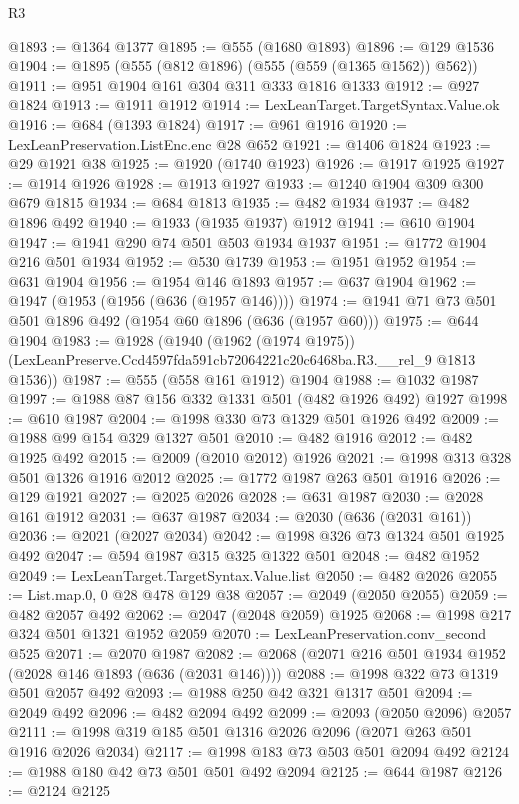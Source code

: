 \begin{lexlean}{R3}
\begin{coremodule}
@1893 := @1364 @1377
@1895 := @555 (@1680 @1893)
@1896 := @129 @1536
@1904 := @1895 (@555 (@812 @1896) (@555 (@559 (@1365 @1562)) @562))
@1911 := @951 @1904 @161 @304 @311 @333 @1816 @1333
@1912 := @927 @1824
@1913 := @1911 @1912
@1914 := LexLeanTarget.TargetSyntax.Value.ok
@1916 := @684 (@1393 @1824)
@1917 := @961 @1916
@1920 := LexLeanPreservation.ListEnc.enc @28 @652
@1921 := @1406 @1824
@1923 := @29 @1921 @38
@1925 := @1920 (@1740 @1923)
@1926 := @1917 @1925
@1927 := @1914 @1926
@1928 := @1913 @1927
@1933 := @1240 @1904 @309 @300 @679 @1815
@1934 := @684 @1813
@1935 := @482 @1934
@1937 := @482 @1896 @492
@1940 := @1933 (@1935 @1937) @1912
@1941 := @610 @1904
@1947 := @1941 @290 @74 @501 @503 @1934 @1937
@1951 := @1772 @1904 @216 @501 @1934
@1952 := @530 @1739
@1953 := @1951 @1952
@1954 := @631 @1904
@1956 := @1954 @146 @1893
@1957 := @637 @1904
@1962 := @1947 (@1953 (@1956 (@636 (@1957 @146))))
@1974 := @1941 @71 @73 @501 @501 @1896 @492 (@1954 @60 @1896 (@636 (@1957 @60)))
@1975 := @644 @1904
@1983 := @1928
    (@1940
      (@1962 (@1974 @1975))
      (LexLeanPreserve.Ccd4597fda591cb72064221c20c6468ba.R3.__rel_9 @1813 @1536))
@1987 := @555 (@558 @161 @1912) @1904
@1988 := @1032 @1987
@1997 := @1988 @87 @156 @332 @1331 @501 (@482 @1926 @492) @1927
@1998 := @610 @1987
@2004 := @1998 @330 @73 @1329 @501 @1926 @492
@2009 := @1988 @99 @154 @329 @1327 @501
@2010 := @482 @1916
@2012 := @482 @1925 @492
@2015 := @2009 (@2010 @2012) @1926
@2021 := @1998 @313 @328 @501 @1326 @1916 @2012
@2025 := @1772 @1987 @263 @501 @1916
@2026 := @129 @1921
@2027 := @2025 @2026
@2028 := @631 @1987
@2030 := @2028 @161 @1912
@2031 := @637 @1987
@2034 := @2030 (@636 (@2031 @161))
@2036 := @2021 (@2027 @2034)
@2042 := @1998 @326 @73 @1324 @501 @1925 @492
@2047 := @594 @1987 @315 @325 @1322 @501
@2048 := @482 @1952
@2049 := LexLeanTarget.TargetSyntax.Value.list
@2050 := @482 @2026
@2055 := List.map.{0, 0} @28 @478 @129 @38
@2057 := @2049 (@2050 @2055)
@2059 := @482 @2057 @492
@2062 := @2047 (@2048 @2059) @1925
@2068 := @1998 @217 @324 @501 @1321 @1952 @2059
@2070 := LexLeanPreservation.conv_second @525
@2071 := @2070 @1987
@2082 := @2068 (@2071 @216 @501 @1934 @1952 (@2028 @146 @1893 (@636 (@2031 @146))))
@2088 := @1998 @322 @73 @1319 @501 @2057 @492
@2093 := @1988 @250 @42 @321 @1317 @501
@2094 := @2049 @492
@2096 := @482 @2094 @492
@2099 := @2093 (@2050 @2096) @2057
@2111 := @1998 @319 @185 @501 @1316 @2026 @2096 (@2071 @263 @501 @1916 @2026 @2034)
@2117 := @1998 @183 @73 @503 @501 @2094 @492
@2124 := @1988 @180 @42 @73 @501 @501 @492 @2094
@2125 := @644 @1987
@2126 := @2124 @2125

\end{coremodule}
\end{lexlean}
